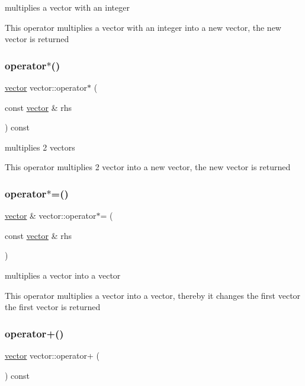multiplies a vector with an integer 

This operator multiplies a vector with an integer into a new vector, the new vector is returned \mbox{\label{classvector_a9ef97fde561d0998f1db1af7c9fbbff8}} 
\subsubsection{\texorpdfstring{operator$\ast$()}{operator*()}\hspace{0.1cm}{\footnotesize\ttfamily [2/2]}}
{\footnotesize\ttfamily \hyperlink{classvector}{vector} vector\+::operator$\ast$ (\begin{DoxyParamCaption}\item[{const \hyperlink{classvector}{vector} \&}]{rhs }\end{DoxyParamCaption}) const}



multiplies 2 vectors 

This operator multiplies 2 vector into a new vector, the new vector is returned \mbox{\label{classvector_ad7dba928c0f8e3bef217dd1d97ebfb8f}} 
\subsubsection{\texorpdfstring{operator$\ast$=()}{operator*=()}}
{\footnotesize\ttfamily \hyperlink{classvector}{vector} \& vector\+::operator$\ast$= (\begin{DoxyParamCaption}\item[{const \hyperlink{classvector}{vector} \&}]{rhs }\end{DoxyParamCaption})}



multiplies a vector into a vector 

This operator multiplies a vector into a vector, thereby it changes the first vector the first vector is returned \mbox{\label{classvector_a9af16b41f973cd073b089bf5371e8a70}} 
\subsubsection{\texorpdfstring{operator+()}{operator+()}\hspace{0.1cm}{\footnotesize\ttfamily [1/2]}}
{\footnotesize\ttfamily \hyperlink{classvector}{vector} vector\+::operator+ (\begin{DoxyParamCaption}{ }\end{DoxyParamCaption}) const}



